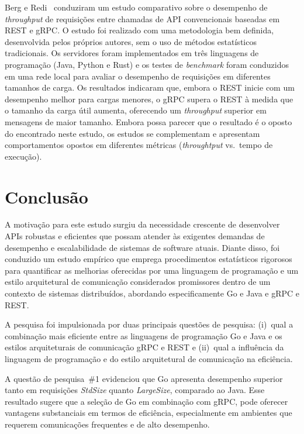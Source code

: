 Berg e Redi~\cite{berg2023benchmarking} conduziram um estudo comparativo sobre o desempenho de \textit{throughput} de requisições entre chamadas de API convencionais baseadas em REST e gRPC.
O estudo foi realizado com uma metodologia bem definida, desenvolvida pelos próprios autores, sem o uso de métodos estatísticos tradicionais.
Os servidores %
foram implementados em três linguagens de programação (Java, Python e Rust) e os testes de \textit{benchmark} foram conduzidos em uma rede local para avaliar o desempenho de requisições em diferentes tamanhos de carga.
Os resultados indicaram que, embora o REST inicie com um desempenho melhor para cargas menores, o gRPC supera o REST à medida que o tamanho da carga útil aumenta, oferecendo um \textit{throughput} superior em mensagens de maior tamanho. Embora possa parecer que o resultado é o oposto do encontrado neste estudo, os estudos se complementam e apresentam comportamentos opostos em diferentes métricas ({\em throughtput} vs.~tempo de execução).

\section{Conclusão}
\label{sec:conclusao}
A motivação para este estudo surgiu da necessidade crescente de desenvolver APIs robustas e eficientes que possam atender às exigentes demandas de desempenho e escalabilidade de sistemas de software atuais. Diante disso, 
foi conduzido um estudo empírico que emprega procedimentos estatísticos rigorosos para quantificar as melhorias oferecidas por uma linguagem de programação e um estilo arquitetural de comunicação considerados promissores dentro de um contexto de sistemas distribuídos, abordando especificamente Go e Java e gRPC e REST. 

A pesquisa foi impulsionada por duas principais questões de pesquisa: (i)~qual a combinação mais eficiente entre as linguagens de programação Go e Java e os estilos arquiteturais de comunicação gRPC e REST e (ii)~qual a influência da linguagem de programação e do estilo arquitetural de comunicação na eficiência. 

A questão de pesquisa~\#1 evidenciou que Go apresenta desempenho superior tanto em requisições \textit{StdSize} quanto \textit{LargeSize}, 
comparado ao Java. Esse resultado sugere que a seleção de Go em combinação com gRPC, pode oferecer vantagens substanciais em termos de eficiência, especialmente em ambientes que requerem comunicações frequentes e de alto desempenho.

